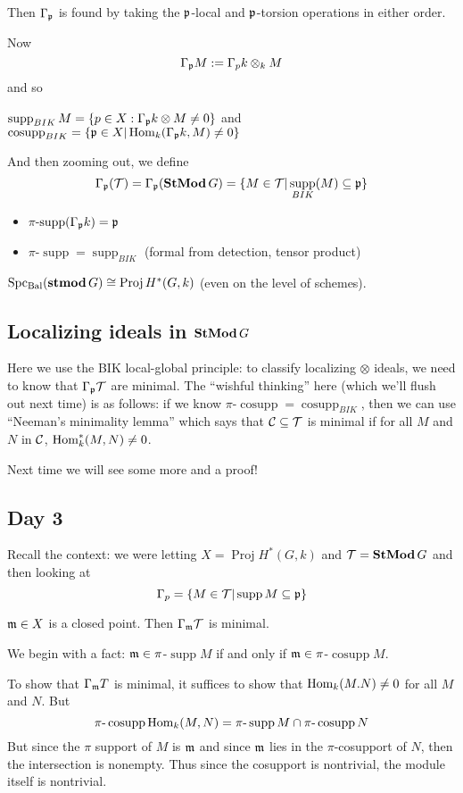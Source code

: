 \documentclass[12pt]{article}
\newcommand{\p}{\frakp}
\newcommand{\m}{\frakm}
\DeclareMathOperator{\supp}{supp}
\DeclareMathOperator{\SpcBal}{Spc_{Bal}}
\begin{document}
Then $\Gamma_\p$ is found by taking the $\p$-local and $\p$-torsion operations in either order.

Now 
\[\Gamma_\p M:=\Gamma_p k\otimes_k M\]
and so
\begin{defn}
	$\supp_{BIK}M=\{p\in X:\Gamma_\p k\otimes M\ne 0\}$ and $\operatorname{cosupp}_{BIK}=\{\p\in X|\Hom_k(\Gamma_\p k,M)\ne 0\}$
\end{defn}

And then zooming out, we define 
\[\Gamma_\p(\calT)=\Gamma_\p(\StMod G)=\{M\in\calT|\supp_{BIK}(M)\subseteq\p\}\]

\begin{prop}
	\begin{itemize}
		\item $\pi$-$\supp(\Gamma_\p k)=\p$
		\item $\pi$-$\supp=\supp_{BIK}$ (formal from detection, tensor product)
	\end{itemize}
\end{prop}
\begin{cor}
	$\SpcBal(\stmod G)\cong\operatorname{Proj}H^\ast(G,k)$ (even on the level of schemes).
\end{cor}

\subsection{Localizing ideals in \texorpdfstring{$\operatorname{\mathbf{StMod}} G$}{StMod G}}
Here we use the BIK local-global principle: to classify localizing $\otimes$ ideals, we need to know that $\Gamma_\p\calT$ are minimal. The ``wishful thinking''
here (which we'll flush out next time) is as follows: if we know $\pi$-$\operatorname{cosupp}=\operatorname{cosupp}_{BIK}$,
then we can use ``Neeman's minimality lemma'' which says that $\mathcal{C}\subseteq\mathcal{T}$ is minimal if for all $M$ and $N$ in $\mathcal{C}$,
$\operatorname{Hom}^\ast_k(M,N)\ne 0$.

Next time we will see some more and a proof!

\subsection{Day 3}
Recall the context: we were letting $X=\operatorname{Proj}H^\ast(G,k)$ and $\mathcal{T}=\operatorname{\mathbf{StMod}} G$ and then looking at
\[\Gamma_p=\{M\in\calT|\supp M\subseteq \p\}\]

\begin{lem}
	$\m\in X$ is a closed point. Then $\Gamma_\m \calT$ is minimal.
\end{lem}
\begin{prf}
	We begin with a fact: $\m\in\pi$-$\supp M$ if and only if $\m\in \pi$-$\operatorname{cosupp} M$.

	To show that $\Gamma_\m T$ is minimal, it suffices to show that $\operatorname{Hom}_k(M.N)\ne 0$ for all $M$ and $N$. But 
	\[\pi\text{-}\operatorname{cosupp}\Hom_k(M,N)=\pi\text{-}\supp M\cap \pi\text{-}\operatorname{cosupp}N\]
	But since the $\pi$ support of $M$ is $\m$ and since $\m$ lies in the $\pi$-cosupport of $N$, then the intersection is nonempty.
	Thus since the cosupport is nontrivial, the module itself is nontrivial.
\end{prf}
\end{document}
